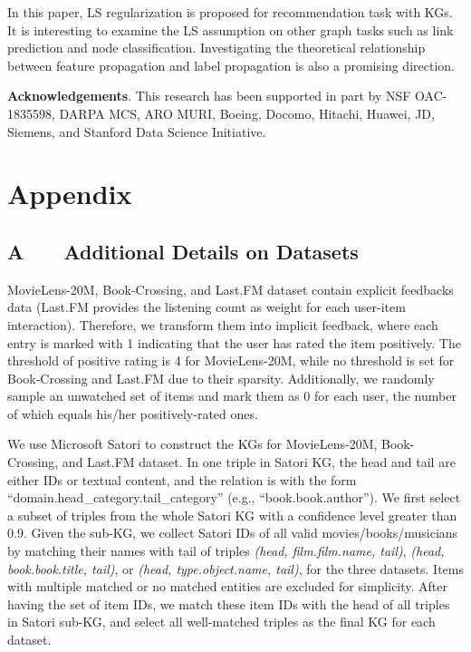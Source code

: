 \documentclass[sigconf]{acmart}
\begin{document}
	In this paper, LS regularization is proposed for recommendation task with KGs.
	It is interesting to examine the LS assumption on other graph tasks such as link prediction and node classification.
	Investigating the theoretical relationship between feature propagation and label propagation is also a promising direction.
	
	
\vspace{1em}
\noindent \textbf{Acknowledgements}.
This research has been supported in part by NSF OAC-1835598, DARPA MCS, ARO MURI, Boeing, Docomo, Hitachi, Huawei, JD, Siemens, and Stanford Data Science Initiative.



 


\newpage
\section*{Appendix}
	\subsection*{A \ \ \ Additional Details on Datasets}
		MovieLens-20M, Book-Crossing, and Last.FM dataset contain explicit feedbacks data (Last.FM provides the listening count as weight for each user-item interaction).
		Therefore, we transform them into implicit feedback, where each entry is marked with 1 indicating that the user has rated the item positively.
		The threshold of positive rating is 4 for MovieLens-20M, while no threshold is set for Book-Crossing and Last.FM due to their sparsity.
		Additionally, we randomly sample an unwatched set of items and mark them as 0 for each user, the number of which equals his/her positively-rated ones.
		
		We use Microsoft Satori to construct the KGs for MovieLens-20M, Book-Crossing, and Last.FM dataset.
		In one triple in Satori KG, the head and tail are either IDs or textual content, and the relation is with the form ``domain.head\_category.tail\_category'' (e.g., ``book.book.author'').
		We first select a subset of triples from the whole Satori KG with a confidence level greater than 0.9.
		Given the sub-KG, we collect Satori IDs of all valid movies/books/musicians by matching their names with tail of triples \textit{(head, film.film.name, tail)}, \textit{(head, book.book.title, tail)}, or \textit{(head, type.object.name, tail)}, for the three datasets.
		Items with multiple matched or no matched entities are excluded for simplicity.
		After having the set of item IDs, we match these item IDs with the head of all triples in Satori sub-KG, and select all well-matched triples as the final KG for each dataset.
		
\end{document}
